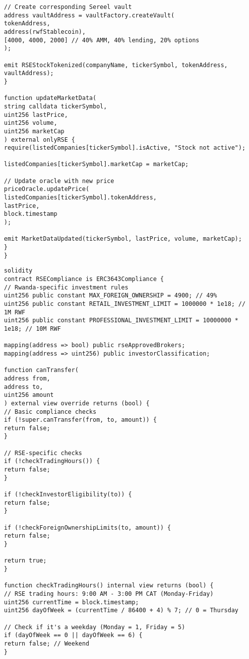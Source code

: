 \documentclass[12pt]{article}
\begin{document}
{{{\begin{lstlisting}
// Create corresponding Sereel vault
address vaultAddress = vaultFactory.createVault(
tokenAddress,
address(rwfStablecoin),
[4000, 4000, 2000] // 40% AMM, 40% lending, 20% options
);

emit RSEStockTokenized(companyName, tickerSymbol, tokenAddress, vaultAddress);
}

function updateMarketData(
string calldata tickerSymbol,
uint256 lastPrice,
uint256 volume,
uint256 marketCap
) external onlyRSE {
require(listedCompanies[tickerSymbol].isActive, "Stock not active");

listedCompanies[tickerSymbol].marketCap = marketCap;

// Update oracle with new price
priceOracle.updatePrice(
listedCompanies[tickerSymbol].tokenAddress,
lastPrice,
block.timestamp
);

emit MarketDataUpdated(tickerSymbol, lastPrice, volume, marketCap);
}
}
\end{lstlisting}



\begin{lstlisting}
solidity
contract RSECompliance is ERC3643Compliance {
// Rwanda-specific investment rules
uint256 public constant MAX_FOREIGN_OWNERSHIP = 4900; // 49%
uint256 public constant RETAIL_INVESTMENT_LIMIT = 1000000 * 1e18; // 1M RWF
uint256 public constant PROFESSIONAL_INVESTMENT_LIMIT = 10000000 * 1e18; // 10M RWF

mapping(address => bool) public rseApprovedBrokers;
mapping(address => uint256) public investorClassification;

function canTransfer(
address from,
address to,
uint256 amount
) external view override returns (bool) {
// Basic compliance checks
if (!super.canTransfer(from, to, amount)) {
return false;
}

// RSE-specific checks
if (!checkTradingHours()) {
return false;
}

if (!checkInvestorEligibility(to)) {
return false;
}

if (!checkForeignOwnershipLimits(to, amount)) {
return false;
}

return true;
}

function checkTradingHours() internal view returns (bool) {
// RSE trading hours: 9:00 AM - 3:00 PM CAT (Monday-Friday)
uint256 currentTime = block.timestamp;
uint256 dayOfWeek = (currentTime / 86400 + 4) % 7; // 0 = Thursday

// Check if it's a weekday (Monday = 1, Friday = 5)
if (dayOfWeek == 0 || dayOfWeek == 6) {
return false; // Weekend
}


\end{lstlisting}}}}
\end{document}
